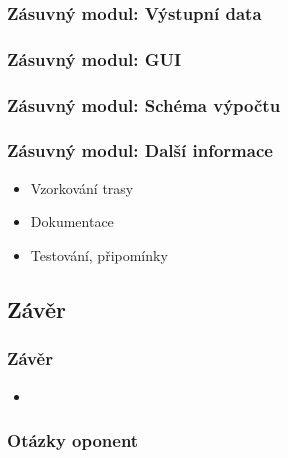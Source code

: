 \documentclass{beamer}
\begin{document}
\begin{frame}
\frametitle{Zásuvný modul: Výstupní data}
\end{frame}

\begin{frame}
\frametitle{Zásuvný modul: GUI}

\end{frame}

\begin{frame}
\frametitle{Zásuvný modul: Schéma výpočtu}

\end{frame}

\begin{frame}
\frametitle{Zásuvný modul: Další informace}
\begin{itemize}
	\item Vzorkování trasy
	\item Dokumentace
	\item Testování, připomínky
\end{itemize}
\end{frame}


\begin{frame}
\section{Závěr}
\frametitle{Závěr}
\begin{itemize}
	\item %
\end{itemize}
\end{frame}

\begin{frame}
\frametitle{Otázky oponent}
\end{frame}
\end{document}
